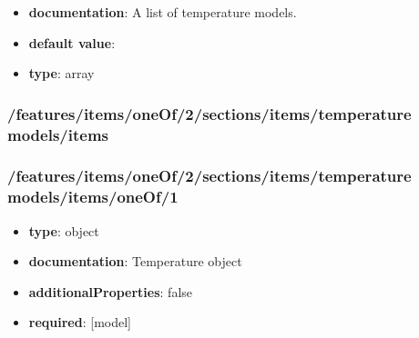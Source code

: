 \begin{itemize}\item {\bf documentation}: A list of temperature models.
\item {\bf default value}: 
\item {\bf type}: array
\end{itemize}\subsubsection{/features/items/oneOf/2/sections/items/temperature models/items}

\subsubsection{/features/items/oneOf/2/sections/items/temperature models/items/oneOf/1}
\begin{itemize}\item {\bf type}: object
\item {\bf documentation}: Temperature object
\item {\bf additionalProperties}: false
\item {\bf required}: [model]\end{itemize}
